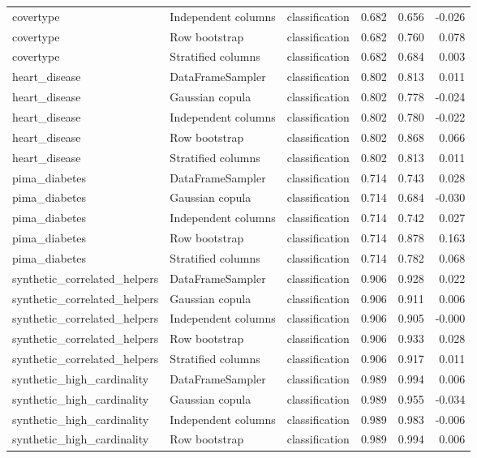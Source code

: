 \begin{table}
\begin{adjustbox}{max width=\textwidth}
\begin{tabular}{lllrrr}
covertype & Independent columns & classification & 0.682 & 0.656 & -0.026 \\
covertype & Row bootstrap & classification & 0.682 & 0.760 & 0.078 \\
covertype & Stratified columns & classification & 0.682 & 0.684 & 0.003 \\
heart\_disease & DataFrameSampler & classification & 0.802 & 0.813 & 0.011 \\
heart\_disease & Gaussian copula & classification & 0.802 & 0.778 & -0.024 \\
heart\_disease & Independent columns & classification & 0.802 & 0.780 & -0.022 \\
heart\_disease & Row bootstrap & classification & 0.802 & 0.868 & 0.066 \\
heart\_disease & Stratified columns & classification & 0.802 & 0.813 & 0.011 \\
pima\_diabetes & DataFrameSampler & classification & 0.714 & 0.743 & 0.028 \\
pima\_diabetes & Gaussian copula & classification & 0.714 & 0.684 & -0.030 \\
pima\_diabetes & Independent columns & classification & 0.714 & 0.742 & 0.027 \\
pima\_diabetes & Row bootstrap & classification & 0.714 & 0.878 & 0.163 \\
pima\_diabetes & Stratified columns & classification & 0.714 & 0.782 & 0.068 \\
synthetic\_correlated\_helpers & DataFrameSampler & classification & 0.906 & 0.928 & 0.022 \\
synthetic\_correlated\_helpers & Gaussian copula & classification & 0.906 & 0.911 & 0.006 \\
synthetic\_correlated\_helpers & Independent columns & classification & 0.906 & 0.905 & -0.000 \\
synthetic\_correlated\_helpers & Row bootstrap & classification & 0.906 & 0.933 & 0.028 \\
synthetic\_correlated\_helpers & Stratified columns & classification & 0.906 & 0.917 & 0.011 \\
synthetic\_high\_cardinality & DataFrameSampler & classification & 0.989 & 0.994 & 0.006 \\
synthetic\_high\_cardinality & Gaussian copula & classification & 0.989 & 0.955 & -0.034 \\
synthetic\_high\_cardinality & Independent columns & classification & 0.989 & 0.983 & -0.006 \\
synthetic\_high\_cardinality & Row bootstrap & classification & 0.989 & 0.994 & 0.006 \\

\end{tabular}
\end{adjustbox}
\end{table}
